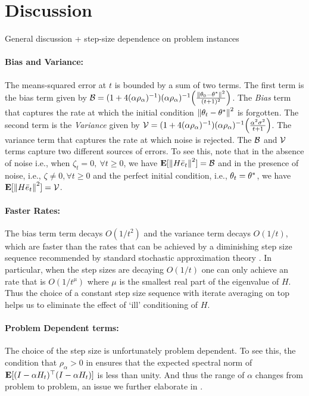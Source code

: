 \section{Discussion}
\label{sec:discussion}
General discussion + step-size dependence on problem instances

\paragraph{Bias and Variance:} The means-squared error at $t$ is bounded by a sum of two terms. The first term is the bias term given by $\mathcal{B}=(1+4(\alpha\rho_{\alpha})^{-1}) (\alpha\rho_{\alpha})^{-1} \Big(\frac{\left\| \theta_0-\theta^*\right\|^2}{(t+1)^2}\Big)$.  The \emph{Bias} term that captures the rate at which the initial condition $\left\| \theta_t-\theta^*\right\|^2$ is forgotten. The second term is the \emph{Variance} given by $\mathcal{V}=(1+4(\alpha\rho_{\alpha})^{-1}) (\alpha\rho_{\alpha})^{-1} \Big(\frac{\alpha^2\sigma^2}{t+1} \Big)$. The variance term that captures the rate at which noise is rejected. The $\mathcal{B}$ and $\mathcal{V}$ terms capture two different sources of errors. To see this, note that in the absence of noise i.e., when $\zeta_t=0,~\forall t\geq 0$, we have $\mathbf{E}[\left\| H\bar{e}_t\right\|^2]=\mathcal{B}$ and in the presence of noise, i.e., $\zeta\neq 0,\forall t\geq 0$ and the perfect initial condition, i.e., $\theta_t=\theta^*$, we have $\mathbf{E}[\left\| H\bar{e}_t\right\|^2]=\mathcal{V}$.

\paragraph{Faster Rates:} The bias term term decays $O(1/t^2)$ and the variance term decays $O(1/t)$, which are faster than the rates that can be achieved by a diminishing step size sequence recommended by standard stochastic approximation theory \cite{SA}. In particular, when the step sizes are decaying $O(1/t)$ one can only achieve an rate that is $O(1/t^\mu)$ where $\mu$ is the smallest real part of the eigenvalue of $H$. Thus the choice of a constant step size sequence with iterate averaging on top helps us to eliminate the effect of `ill' conditioning of $H$.

\paragraph{Problem Dependent terms:} The choice of the step size is unfortunately problem dependent. To see this, the condition that $\rho_{\alpha}>0$ in  ensures that the expected spectral norm of $\mathbf{E}[(I-\alpha H_t)^\top(I-\alpha H_t)]$ is less than unity. And thus the range of $\alpha$ changes from problem to problem, an issue we further elaborate in .

